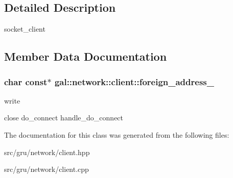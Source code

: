 \subsection{\-Detailed \-Description}
socket\-\_\-client 

\subsection{\-Member \-Data \-Documentation}
\hypertarget{classgal_1_1network_1_1client_a50f554a8893793fdd9e0a2d53b79f60e}{
\subsubsection[{foreign\-\_\-address\-\_\-}]{\setlength{\rightskip}{0pt plus 5cm}char const$\ast$ {\bf gal\-::network\-::client\-::foreign\-\_\-address\-\_\-}}}\label{classgal_1_1network_1_1client_a50f554a8893793fdd9e0a2d53b79f60e}


write 

close do\-\_\-connect handle\-\_\-do\-\_\-connect 

\-The documentation for this class was generated from the following files\-:\begin{DoxyCompactItemize}
\item 
src/gru/network/client.\-hpp\item 
src/gru/network/client.\-cpp\end{DoxyCompactItemize}

